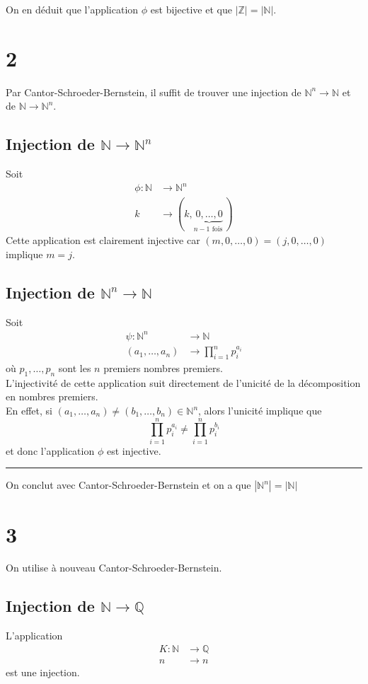 \documentclass[11pt, a4paper, twoside]{article}
\newcommand\hr{
    \noindent\rule[0.5ex]{\linewidth}{0.5pt}\newline
}
\begin{document}
On en déduit que l'application $\phi$ est bijective et que $|\mathbb{Z}| = |\mathbb{N}|$.
\section*{2}
Par Cantor-Schroeder-Bernstein, il suffit de trouver une injection de $ \mathbb{N}^{n} \to \mathbb{N}$
et de $\mathbb{N} \to \mathbb{N}^{n}$.\\
\subsection*{ Injection de $\mathbb{N} \to \mathbb{N}^{n}$}
Soit 
 \begin{align*}
	 \phi: \mathbb{N} &\to \mathbb{N}^{n}\\ 
	 k &\to (k, \underbrace{0, \ldots, 0}_{n-1 \text{ fois } })
\end{align*}
Cette application est clairement injective car $ ( m, 0, \ldots, 0) = (j, 0, \ldots, 0)$ implique $m=j$.
\subsection*{Injection de $ \mathbb{N}^{n} \to \mathbb{N}$}
Soit
\begin{align*}
	\psi: \mathbb{N}^{n} &\to \mathbb{N}\\
	( a_1, \ldots, a_n) & \to \prod_{i=1} ^{n} p_{i} ^{a_i}
\end{align*}
où $ p_1, \ldots, p_n$ sont les $n$ premiers nombres premiers.\\
L'injectivité de cette application suit directement de l'unicité de la décomposition en nombres premiers.\\
En effet, si $ (a_1, \ldots, a_n) \neq ( b_1, \ldots ,b_n) \in \mathbb{N}^{n}$, alors l'unicité implique que
\[ 
\prod_{i=1} ^{n} p_i^{a_i} \neq \prod_{i=1} ^{n}p_i^{b_i}
\]
et donc l'application $\phi$ est injective.\\
\hr
On conclut avec Cantor-Schroeder-Bernstein et on a que $ |\mathbb{N}^{n}| = | \mathbb{N}|$
\section*{3}
On utilise à nouveau Cantor-Schroeder-Bernstein.\\
\subsection*{Injection de $\mathbb{N} \to \mathbb{Q}$}
L'application
\begin{align*}
	K: \mathbb{N} &\to \mathbb{Q}\\
	 n &\to n
\end{align*}
est une injection.\\
\end{document}
